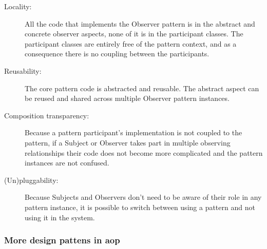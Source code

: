 \begin{description}
	\item [Locality:] All the code that implements the Observer pattern is in the abstract and concrete observer aspects, none of it is in the participant classes. The participant classes are entirely free of the pattern context, and as a consequence there is no coupling between the participants. 

	\item [Reusability:] The core pattern code is abstracted and reusable. The abstract aspect can be reused and shared across multiple Observer pattern instances.

	\item [Composition transparency:] Because a pattern participant’s implementation is not coupled to the pattern, if a Subject or Observer takes part in multiple observing relationships their code does not become more complicated and the pattern instances are not confused. 

	\item [(Un)pluggability:] Because Subjects and Observers don’t need to be aware of their role in any pattern instance, it is possible to switch between using a pattern and not using it in the system. 
\end{description}

\subsubsection{More design pattens in \acrlong{aop}}\label{More design pattens in Aspect Oriented Programming}



